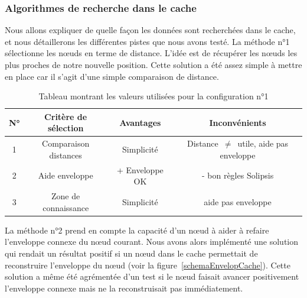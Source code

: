 \subsubsection{Algorithmes de recherche dans le cache}
\par Nous allons expliquer de quelle façon les données sont recherchées dans le cache, et nous détaillerons les différentes pistes que nous avons testé. La méthode n°1 sélectionne les nœuds en terme de distance. L'idée est de récupérer les nœuds les plus proches de notre nouvelle position. Cette solution a été assez simple à mettre en place car il s'agit d'une simple comparaison de distance. 
\begin{table}[!h]
  \begin{center}
    \begin{tabular}{|c|c|c|c|}
      \hline
      N° & Critère de sélection & Avantages & Inconvénients\\
      \hline
      	1 & Comparaison distances & Simplicité & Distance~$\ne$~utile, aide pas enveloppe\\
      	2 & Aide enveloppe & + Enveloppe OK & - bon règles Solipsis\\
      	3 & Zone de connaissance & Simplicité & aide pas enveloppe\\
      \hline
    \end{tabular}
  \end{center}
  \label{tab:config1}
  \caption{Tableau montrant les valeurs utilisées pour la configuration n°1}
\end{table}


\par La méthode n°2 prend en compte la capacité d'un nœud à aider à refaire l'enveloppe connexe du nœud courant. Nous avons alors implémenté une solution qui rendait un résultat positif si un nœud dans le cache permettait de reconstruire l'enveloppe du nœud (voir la figure~\ref{schemaEnvelopCache}). Cette solution a même été agrémentée d'un test si le nœud faisait avancer positivement l'enveloppe connexe mais ne la reconstruisait pas immédiatement.

